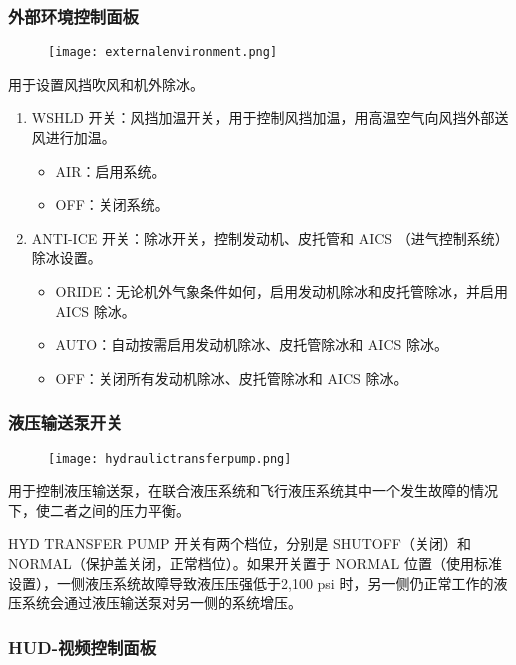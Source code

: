 \subsubsection{外部环境控制面板}

\begin{figure}[htb]
  \center
  \texttt{[image: externalenvironment.png]}
\end{figure}
用于设置风挡吹风和机外除冰。

\begin{enumerate}
  \item WSHLD 开关：风挡加温开关，用于控制风挡加温，用高温空气向风挡外部送风进行加温。
  \begin{itemize}
    \item AIR：启用系统。
    \item OFF：关闭系统。
  \end{itemize}
  \item ANTI-ICE 开关：除冰开关，控制发动机、皮托管和 AICS （进气控制系统）除冰设置。
  \begin{itemize}
    \item ORIDE：无论机外气象条件如何，启用发动机除冰和皮托管除冰，并启用 AICS 除冰。
    \item AUTO：自动按需启用发动机除冰、皮托管除冰和 AICS 除冰。
    \item OFF：关闭所有发动机除冰、皮托管除冰和 AICS 除冰。
  \end{itemize}
\end{enumerate}

\subsubsection{液压输送泵开关}

\begin{figure}[htb]
  \center
  \texttt{[image: hydraulictransferpump.png]}
\end{figure}
用于控制液压输送泵，在联合液压系统和飞行液压系统其中一个发生故障的情况下，使二者之间的压力平衡。

HYD TRANSFER PUMP 开关有两个档位，分别是 SHUTOFF（关闭）和 NORMAL（保护盖关闭，正常档位）。如果开关置于 NORMAL 位置（使用标准设置），一侧液压系统故障导致液压压强低于2,100 psi 时，另一侧仍正常工作的液压系统会通过液压输送泵对另一侧的系统增压。

\subsubsection{HUD-视频控制面板}

